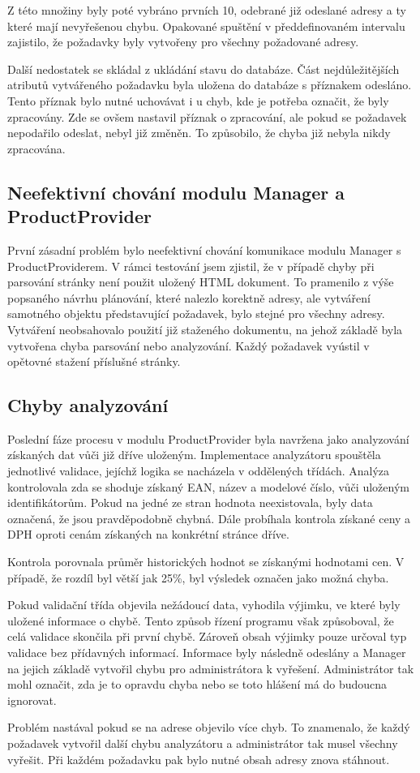 \documentclass[thesis=B,czech]{FITthesis}[2012/06/26]
\begin{document}
Z této množiny byly poté vybráno prvních 10, odebrané již odeslané adresy a ty které mají nevyřešenou chybu. Opakované spuštění v předdefinovaném 
intervalu zajistilo, že požadavky byly vytvořeny pro všechny požadované adresy.
\par
Další nedostatek se skládal z ukládání stavu do databáze. Část nejdůležitějších atributů vytvářeného požadavku byla uložena do databáze 
s příznakem odesláno. Tento příznak bylo nutné uchovávat i u chyb, kde je potřeba označit, že byly zpracovány. Zde se 
ovšem nastavil příznak o zpracování, ale pokud se požadavek nepodařilo odeslat, nebyl již změněn. To způsobilo, že chyba již 
nebyla nikdy zpracována.

\subsection{Neefektivní chování modulu Manager a ProductProvider}\label{ch:manager-pd}
První zásadní problém bylo neefektivní chování komunikace modulu Manager s ProductProviderem. V rámci testování jsem zjistil, že v 
případě chyby při parsování stránky není použit uložený HTML dokument.
To pramenilo z výše popsaného návrhu plánování, které nalezlo korektně adresy, ale vytváření samotného objektu představující požadavek,
bylo stejné pro všechny adresy. Vytváření neobsahovalo použití již staženého dokumentu, na jehož základě byla vytvořena 
chyba parsování nebo analyzování. Každý požadavek vyústil v opětovné stažení příslušné stránky.

\subsection{Chyby analyzování}
Poslední fáze procesu v modulu ProductProvider byla navržena jako analyzování získaných dat vůči již dříve uloženým. Implementace analyzátoru 
spouštěla jednotlivé validace, jejíchž logika se nacházela v oddělených třídách. 
Analýza kontrolovala zda se shoduje získaný EAN, název a modelové číslo, vůči uloženým identifikátorům. Pokud na jedné ze stran hodnota neexistovala, byly data označená, že jsou pravděpodobně chybná. Dále probíhala kontrola získané ceny  a  DPH oproti cenám získaných na konkrétní stránce dříve.
\par
Kontrola porovnala průměr historických hodnot se získanými hodnotami cen. V případě, že rozdíl byl větší jak 25\%, byl výsledek označen jako
možná chyba.
\par
Pokud validační třída objevila nežádoucí data,
vyhodila výjimku, ve které byly uložené informace o chybě. Tento způsob řízení programu však způsoboval, že celá validace skončila při první chybě.
Zároveň obsah výjimky pouze určoval typ validace bez přídavných informací.
Informace byly následně odeslány a Manager na jejich základě vytvořil chybu pro administrátora k vyřešení. Administrátor tak mohl 
označit, zda je to opravdu chyba nebo se toto hlášení má do budoucna ignorovat.
\par
Problém nastával pokud se na adrese objevilo více chyb. To znamenalo, že každý požadavek vytvořil další
chybu analyzátoru a administrátor tak musel všechny vyřešit. Při každém požadavku pak bylo nutné obsah adresy znova stáhnout.
\end{document}
